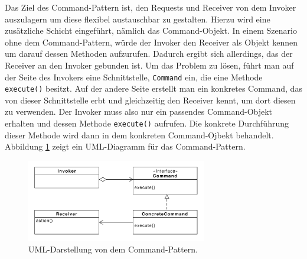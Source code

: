 Das Ziel des Command-Pattern ist, den Requests und Receiver von dem Invoker auszulagern um diese flexibel austauschbar zu gestalten. Hierzu wird eine zusätzliche Schicht eingeführt, nämlich das Command-Objekt. In einem  Szenario ohne dem Command-Pattern, würde der Invoker den Receiver als Objekt kennen um darauf dessen Methoden aufzurufen. Dadurch ergibt sich allerdings, das der Receiver an den Invoker gebunden ist. Um das  Problem zu lösen, führt man auf der Seite des Invokers eine Schnittstelle, \texttt{Command} ein, die eine Methode \texttt{execute()} besitzt. Auf der andere Seite erstellt man ein konkretes Command, das von dieser Schnittstelle erbt und gleichzeitig den Receiver kennt, um dort diesen zu verwenden. Der Invoker muss also nur ein passendes Command-Objekt erhalten und  dessen Methode \texttt{execute()} aufrufen. Die konkrete Durchführung dieser Methode wird  dann in dem konkreten Command-Ojbekt behandelt. Abbildung \ref{commanddiagramm} zeigt ein UML-Diagramm für das Command-Pattern.


\begin{figure}[htbp]
\centering
\includegraphics[width=0.7\textwidth]{./paper/command/command}
\caption{UML-Darstellung von dem Command-Pattern.}
\label{commanddiagramm}
\end{figure} 